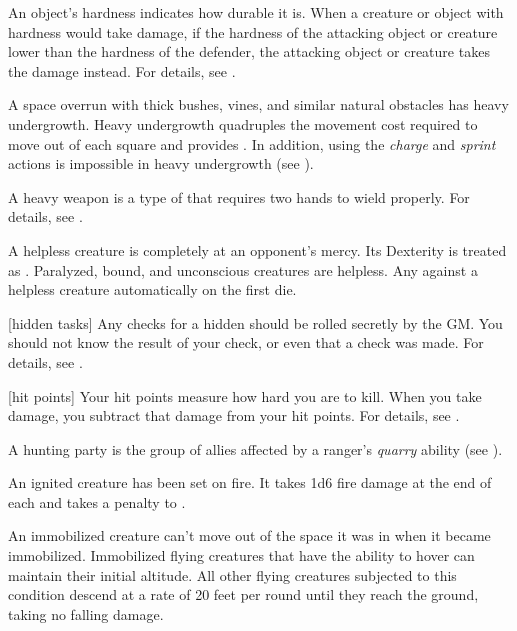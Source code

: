 An object's hardness indicates how durable it is.
When a creature or object with hardness would take damage, if the hardness of the attacking object or creature lower than the hardness of the defender, the attacking object or creature takes the damage instead.
For details, see .

 A space overrun with thick bushes, vines, and similar natural obstacles has heavy undergrowth.
Heavy undergrowth quadruples the movement cost required to move out of each square and provides .
In addition, using the \textit{charge} and \textit{sprint} actions is impossible in heavy undergrowth (see ).

 A heavy weapon is a type of  that requires two hands to wield properly.
For details, see .

 A helpless creature is completely at an opponent's mercy.
Its Dexterity is treated as .
Paralyzed, bound, and unconscious creatures are helpless.
Any  against a helpless creature automatically  on the first die.

[hidden tasks] Any checks for a hidden  should be rolled secretly by the GM.\@
You should not know the result of your check, or even that a check was made.
For details, see .

[hit points] Your hit points measure how hard you are to kill.
When you take damage, you subtract that damage from your hit points.
For details, see .

 A hunting party is the group of allies affected by a ranger's \textit{quarry} ability (see ).

 An ignited creature has been set on fire.
It takes 1d6 fire damage at the end of each  and takes a  penalty to .

 An immobilized creature can't move out of the space it was in when it became immobilized.
Immobilized flying creatures that have the ability to hover can maintain their initial altitude.
All other flying creatures subjected to this condition descend at a rate of 20 feet per round until they reach the ground, taking no falling damage.

